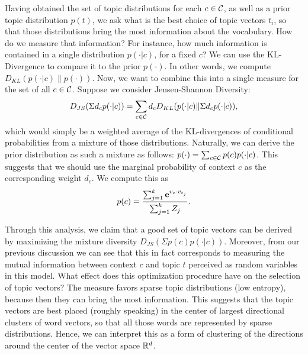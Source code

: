 \documentclass{article} %
\begin{document}
Having obtained the set of topic distributions for each $c\in{\mathcal C}$, as
well as a prior topic distribution $p(t)$, we ask what is the best
choice of topic vectors $t_i$, so that those distributions bring the
most information about the vocabulary. How do we measure that
information? For instance, how much information is contained in a
single distribution $p(\cdot|c)$, for a fixed $c$? We
can use the KL-Divergence to compare it to the prior $p(\cdot)$. In
other words, we compute $D_{KL}(p(\cdot|c)\|p(\cdot))$. Now, we want to
combine this into a single measure for the set of all
$c\in{\mathcal C}$. Suppose we consider Jensen-Shannon Diversity:
\[D_{JS}(\Sigma d_c p(\cdot|c)) = \sum_{c\in{\mathcal C}}d_c D_{KL}(p(\cdot|c)\|\Sigma d_c p(\cdot|c)),\]
which would simply be a weighted average of the KL-divergences of
conditional probabilities from a
mixture of those distributions. Naturally, we can
derive the prior distribution as such a mixture as follows:
$p(\cdot)=\sum_{c\in{\mathcal C}}p(c) p(\cdot|c)$.
This suggests that we should use the marginal probability of context
$c$ as the corresponding weight $d_c$. We compute this as
\[p(c)=\frac{\sum_{j=1}^k\operatorname{\mathbf{e}}^{v_c\cdot v_{t_j}}}{\sum_{j=1}^k Z_j}.\]

Through this analysis, we claim that a good set of topic vectors can
be derived by maximizing the mixture diversity $D_{JS}(\Sigma
p(c)p(\cdot|c))$. Moreover, from our previous discussion we can see
that this in fact corresponds to measuring the mutual information
between context $c$ and topic $t$ perceived as random variables in
this model. What effect does this optimization procedure have on the
selection of topic vectors? The measure favors sparse topic distributions (low
entropy), because then they can bring the most information. This
suggests that the topic vectors are best placed (roughly speaking) in
the center of largest directional clusters of word vectors, so that
all those words are represented by sparse distributions. Hence, we can
interpret this as a form of  
clustering of the directions around the center of the vector space
${\mathbb R}^d$. 
\end{document}
